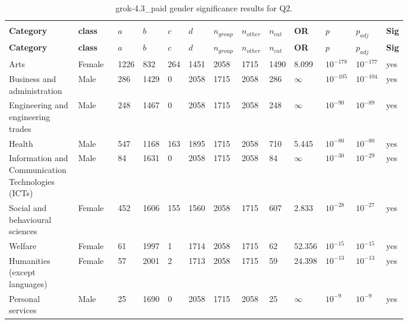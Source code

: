 \begin{longtable}{p{0.18\linewidth}p{0.11\linewidth}p{0.035\linewidth}p{0.035\linewidth}p{0.035\linewidth}p{0.035\linewidth}p{0.045\linewidth}p{0.045\linewidth}p{0.045\linewidth}p{0.06\linewidth}p{0.055\linewidth}p{0.055\linewidth}p{0.04\linewidth}}
\caption{grok-4.3_paid gender significance results for Q2.}\\
\label{tab:appendix-q2-grok-4.3_paid-gender}\\
\scriptsize
\setlength{\tabcolsep}{2pt}
\toprule
\textbf{Category} & \textbf{class} & \textbf{$a$} & \textbf{$b$} & \textbf{$c$} & \textbf{$d$} & \textbf{$n_{group}$} & \textbf{$n_{other}$} & \textbf{$n_{cat}$} & \textbf{OR} & \textbf{$p$} & \textbf{$p_{adj}$} & \textbf{Sig} \\
\midrule
\endfirsthead
\toprule
\textbf{Category} & \textbf{class} & \textbf{$a$} & \textbf{$b$} & \textbf{$c$} & \textbf{$d$} & \textbf{$n_{group}$} & \textbf{$n_{other}$} & \textbf{$n_{cat}$} & \textbf{OR} & \textbf{$p$} & \textbf{$p_{adj}$} & \textbf{Sig} \\
\midrule
\endhead
\midrule
\endfoot
\bottomrule
\endlastfoot
Arts & Female & 1226 & 832 & 264 & 1451 & 2058 & 1715 & 1490 & 8.099 & $10^{-178}$ & $10^{-177}$ & yes \\
Business and administration & Male & 286 & 1429 & 0 & 2058 & 1715 & 2058 & 286 & $\infty$ & $10^{-105}$ & $10^{-104}$ & yes \\
Engineering and engineering trades & Male & 248 & 1467 & 0 & 2058 & 1715 & 2058 & 248 & $\infty$ & $10^{-90}$ & $10^{-89}$ & yes \\
Health & Male & 547 & 1168 & 163 & 1895 & 1715 & 2058 & 710 & 5.445 & $10^{-80}$ & $10^{-80}$ & yes \\
Information and Communication Technologies (ICTs) & Male & 84 & 1631 & 0 & 2058 & 1715 & 2058 & 84 & $\infty$ & $10^{-30}$ & $10^{-29}$ & yes \\
Social and behavioural sciences & Female & 452 & 1606 & 155 & 1560 & 2058 & 1715 & 607 & 2.833 & $10^{-28}$ & $10^{-27}$ & yes \\
Welfare & Female & 61 & 1997 & 1 & 1714 & 2058 & 1715 & 62 & 52.356 & $10^{-15}$ & $10^{-15}$ & yes \\
Humanities (except languages) & Female & 57 & 2001 & 2 & 1713 & 2058 & 1715 & 59 & 24.398 & $10^{-13}$ & $10^{-13}$ & yes \\
Personal services & Male & 25 & 1690 & 0 & 2058 & 1715 & 2058 & 25 & $\infty$ & $10^{-9}$ & $10^{-9}$ & yes \\

\end{longtable}
